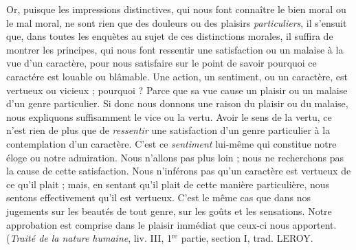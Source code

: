Or, puisque les impressions distinctives, qui nous font
connaître le bien moral ou le mal moral, ne sont rien que
des douleurs ou des plaisirs {\it particuliers}, il s’ensuit que,
dans toutes les enquètes au sujet de ces distinctions morales,
il suffira de montrer les principes, qui nous font ressentir
une satisfaction ou un malaise à la vue d’un caractère,
pour nous satisfaire sur le point de savoir pourquoi ce
caractére est louable ou blâmable. Une action, un sentiment,
ou un caractère, est vertueux ou vicieux ; pourquoi ?
Parce que sa vue cause un plaisir ou un malaise d’un genre
particulier. Si donc nous donnons une raison du plaisir ou
du malaise, nous expliquons suffisamment le vice ou la
vertu. Avoir le sens de la vertu, ce n’est rien de plus que
de {\it ressentir} une satisfaction d’un genre particulier à la
contemplation d’un caractère. C’est ce {\it sentiment} lui-même
qui constitue notre éloge ou notre admiration. Nous
n’allons pas plus loin ; nous ne recherchons pas la cause
de cette satisfaction. Nous n’inférons pas qu'un caractère
est vertueux de ce qu’il plait ; mais, en sentant qu'il plait
de cette manière particulière, nous sentons effectivement
qu’il est vertueux. C’est le même cas que dans nos jugements
sur les beautés de tout genre, sur les goûts et les
sensations. Notre approbation est comprise dans le plaisir
immédiat que ceux-ci nous apportent. ({\it Traité de la nature
humaine}, liv. III, 1$^\text{re}$ partie, section I, trad. L{\footnotesize EROY}.

